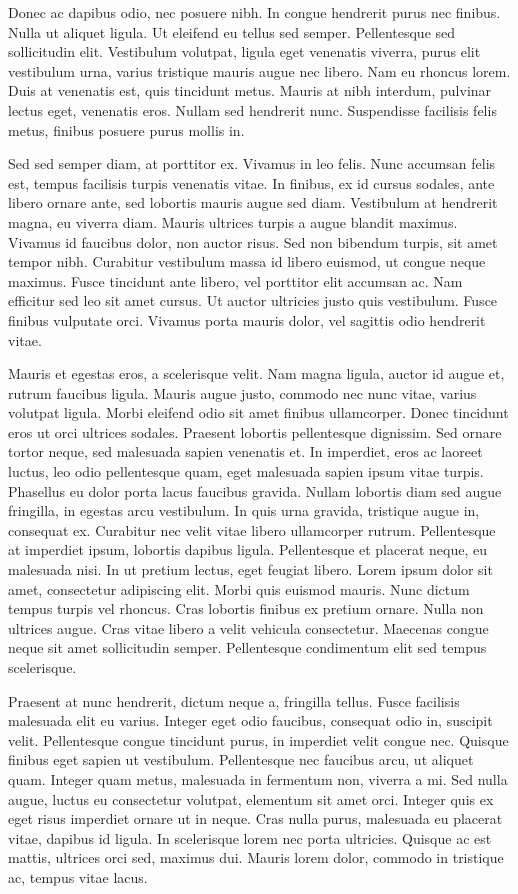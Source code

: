 Donec ac dapibus odio, nec posuere nibh. In congue hendrerit purus nec finibus. Nulla ut aliquet ligula. Ut eleifend eu tellus sed semper. Pellentesque sed sollicitudin elit. Vestibulum volutpat, ligula eget venenatis viverra, purus elit vestibulum urna, varius tristique mauris augue nec libero. Nam eu rhoncus lorem. Duis at venenatis est, quis tincidunt metus. Mauris at nibh interdum, pulvinar lectus eget, venenatis eros. Nullam sed hendrerit nunc. Suspendisse facilisis felis metus, finibus posuere purus mollis in.

Sed sed semper diam, at porttitor ex. Vivamus in leo felis. Nunc accumsan felis est, tempus facilisis turpis venenatis vitae. In finibus, ex id cursus sodales, ante libero ornare ante, sed lobortis mauris augue sed diam. Vestibulum at hendrerit magna, eu viverra diam. Mauris ultrices turpis a augue blandit maximus. Vivamus id faucibus dolor, non auctor risus. Sed non bibendum turpis, sit amet tempor nibh. Curabitur vestibulum massa id libero euismod, ut congue neque maximus. Fusce tincidunt ante libero, vel porttitor elit accumsan ac. Nam efficitur sed leo sit amet cursus. Ut auctor ultricies justo quis vestibulum. Fusce finibus vulputate orci. Vivamus porta mauris dolor, vel sagittis odio hendrerit vitae.

Mauris et egestas eros, a scelerisque velit. Nam magna ligula, auctor id augue et, rutrum faucibus ligula. Mauris augue justo, commodo nec nunc vitae, varius volutpat ligula. Morbi eleifend odio sit amet finibus ullamcorper. Donec tincidunt eros ut orci ultrices sodales. Praesent lobortis pellentesque dignissim. Sed ornare tortor neque, sed malesuada sapien venenatis et. In imperdiet, eros ac laoreet luctus, leo odio pellentesque quam, eget malesuada sapien ipsum vitae turpis. Phasellus eu dolor porta lacus faucibus gravida. Nullam lobortis diam sed augue fringilla, in egestas arcu vestibulum. In quis urna gravida, tristique augue in, consequat ex. Curabitur nec velit vitae libero ullamcorper rutrum. Pellentesque at imperdiet ipsum, lobortis dapibus ligula. Pellentesque et placerat neque, eu malesuada nisi. In ut pretium lectus, eget feugiat libero.
Lorem ipsum dolor sit amet, consectetur adipiscing elit. Morbi quis euismod mauris. Nunc dictum tempus turpis vel rhoncus. Cras lobortis finibus ex pretium ornare. Nulla non ultrices augue. Cras vitae libero a velit vehicula consectetur. Maecenas congue neque sit amet sollicitudin semper. Pellentesque condimentum elit sed tempus scelerisque.

Praesent at nunc hendrerit, dictum neque a, fringilla tellus. Fusce facilisis malesuada elit eu varius. Integer eget odio faucibus, consequat odio in, suscipit velit. Pellentesque congue tincidunt purus, in imperdiet velit congue nec. Quisque finibus eget sapien ut vestibulum. Pellentesque nec faucibus arcu, ut aliquet quam. Integer quam metus, malesuada in fermentum non, viverra a mi. Sed nulla augue, luctus eu consectetur volutpat, elementum sit amet orci. Integer quis ex eget risus imperdiet ornare ut in neque. Cras nulla purus, malesuada eu placerat vitae, dapibus id ligula. In scelerisque lorem nec porta ultricies. Quisque ac est mattis, ultrices orci sed, maximus dui. Mauris lorem dolor, commodo in tristique ac, tempus vitae lacus.

